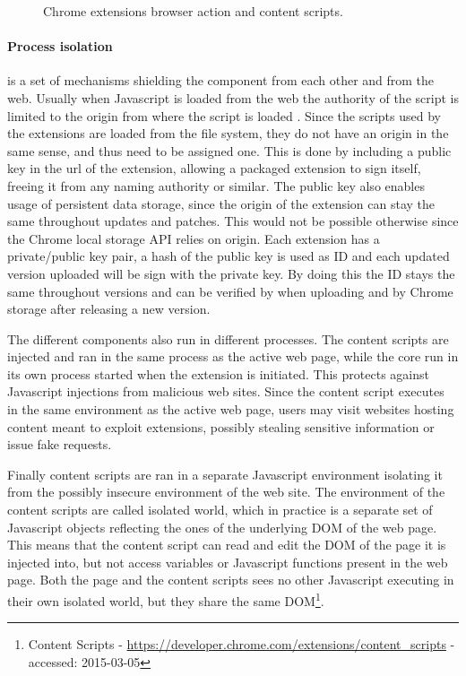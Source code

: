 \begin{figure}[ht]
    \caption{Chrome extensions browser action and content scripts.}
    \label{extension-ux}
\end{figure}

\paragraph{Process isolation} is a set of mechanisms shielding the component from each other and from the web. Usually when Javascript is loaded from the web the authority of the script is limited to the origin from where the script is loaded \cite{protecting-browsers}. Since the scripts used by the extensions are loaded from the file system, they do not have an origin in the same sense, and thus need to be assigned one. This is done by including a public key in the url of the extension, allowing a packaged extension to sign itself, freeing it from any naming authority or similar. The public key also enables usage of persistent data storage, since the origin of the extension can stay the same throughout updates and patches. This would not be possible otherwise since the Chrome local storage API relies on origin. Each extension has a private/public key pair, a hash of the public key is used as ID and each updated version uploaded will be sign with the private key. By doing this the ID stays the same throughout versions and can be verified by when uploading and by Chrome storage after releasing a new version. 


\par The different components also run in different processes. The content scripts are injected and ran in the same process as the active web page, while the core run in its own process started when the extension is initiated. This protects against Javascript injections from malicious web sites\cite{javascript-injection}. Since the content script executes in the same environment as the active web page, users may visit websites hosting content meant to exploit extensions\cite{carlini-chrome}, possibly stealing sensitive information or issue fake requests.
\par Finally content scripts are ran in a separate Javascript environment isolating it from the possibly insecure environment of the web site. The environment of the content scripts are called isolated world, which in practice is a separate set of Javascript objects reflecting the ones of the underlying DOM of the web page. This means that the content script can read and edit the DOM of the page it is injected into, but not access variables or Javascript functions present in the web page. Both the page and the content scripts sees no other Javascript executing in their own isolated world, but they share the same DOM\footnote{Content Scripts - \url{https://developer.chrome.com/extensions/content_scripts} - accessed: 2015-03-05}.


